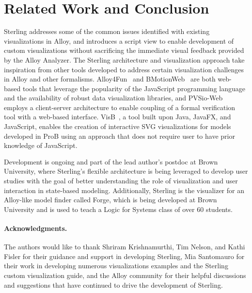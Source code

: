 \documentclass[runningheads]{llncs}
\begin{document}
\section{Related Work and Conclusion}
\label{conclusions}
Sterling addresses some of the common issues identified with existing visualizations in Alloy, and introduces a script view to enable development of custom visualizations without sacrificing the immediate visual feedback provided by the Alloy Analyzer.
The Sterling architecture and visualization approach take inspiration from other tools developed to address certain visualization challenges in Alloy and other formalisms.
Alloy4Fun~\cite{macedo2019} and BMotionWeb~\cite{ladenberger2016} are both web-based tools that leverage the popularity of the JavaScript programming language and the availability of robust data visualization libraries, and PVSio-Web~\cite{oladimeji2014} employs a client-server architecture to enable coupling of a formal verification tool with a web-based interface. VisB~\cite{werth2020}, a tool built upon Java, JavaFX, and JavaScript, enables the creation of interactive SVG visualizations for models developed in ProB using an approach that does not require user to have prior knowledge of JavaScript.

Development is ongoing and part of the lead author's postdoc at Brown University, where Sterling's flexible architecture is being leveraged to develop user studies with the goal of better understanding the role of visualization and user interaction in state-based modeling. 
Additionally, Sterling is the visualizer for an Alloy-like model finder called Forge, which is being developed at Brown University and is used to teach a Logic for Systems class of over 60 students.

\paragraph{\textbf{Acknowledgments.}} The authors would like to thank Shriram Krishnamurthi, Tim Nelson, and Kathi Fisler for their guidance and support in developing Sterling, Mia Santomauro for their work in developing numerous visualizations examples and the Sterling custom visualization guide, and the Alloy community for their helpful discussions and suggestions that have continued to drive the development of Sterling.



\end{document}
